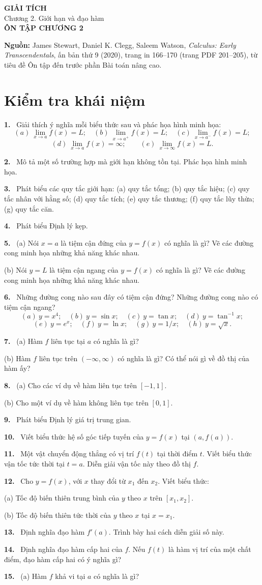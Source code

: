 \documentclass[12pt,a4paper]{article}
\newcommand{\bt}[1]{\par\smallskip\noindent\textbf{#1.}\ }
\begin{document}
\begin{center}
{\Large\bfseries GIẢI TÍCH}\\[5pt]
{\large Chương 2. Giới hạn và đạo hàm}\\[9pt]
{\Large\bfseries ÔN TẬP CHƯƠNG 2}
\end{center}
\noindent\textbf{Nguồn:} James Stewart, Daniel K. Clegg, Saleem Watson, \textit{Calculus: Early Transcendentals}, ấn bản thứ 9 (2020), trang in 166–170 (trang PDF 201–205), từ tiêu đề Ôn tập đến trước phần Bài toán nâng cao.
\section*{Kiểm tra khái niệm}
\bt{1} Giải thích ý nghĩa mỗi biểu thức sau và phác họa hình minh họa:
\[(a)\ \lim_{x\to a}f(x)=L;\quad(b)\ \lim_{x\to a^+}f(x)=L;\quad(c)\ \lim_{x\to a^-}f(x)=L;\]
\[(d)\ \lim_{x\to a}f(x)=\infty;\qquad(e)\ \lim_{x\to\infty}f(x)=L.\]
\bt{2} Mô tả một số trường hợp mà giới hạn không tồn tại. Phác họa hình minh họa.
\bt{3} Phát biểu các quy tắc giới hạn: (a) quy tắc tổng; (b) quy tắc hiệu; (c) quy tắc nhân với hằng số; (d) quy tắc tích; (e) quy tắc thương; (f) quy tắc lũy thừa; (g) quy tắc căn.
\bt{4} Phát biểu Định lý kẹp.
\bt{5} (a) Nói $x=a$ là tiệm cận đứng của $y=f(x)$ có nghĩa là gì? Vẽ các đường cong minh họa những khả năng khác nhau.

(b) Nói $y=L$ là tiệm cận ngang của $y=f(x)$ có nghĩa là gì? Vẽ các đường cong minh họa những khả năng khác nhau.
\bt{6} Những đường cong nào sau đây có tiệm cận đứng? Những đường cong nào có tiệm cận ngang?
\[(a)\ y=x^4;\quad(b)\ y=\sin x;\quad(c)\ y=\tan x;\quad(d)\ y=\tan^{-1}x;\]
\[(e)\ y=e^x;\quad(f)\ y=\ln x;\quad(g)\ y=1/x;\quad(h)\ y=\sqrt{x}.\]
\bt{7} (a) Hàm $f$ liên tục tại $a$ có nghĩa là gì?

(b) Hàm $f$ liên tục trên $(-\infty,\infty)$ có nghĩa là gì? Có thể nói gì về đồ thị của hàm ấy?
\bt{8} (a) Cho các ví dụ về hàm liên tục trên $[-1,1]$.

(b) Cho một ví dụ về hàm không liên tục trên $[0,1]$.
\bt{9} Phát biểu Định lý giá trị trung gian.
\bt{10} Viết biểu thức hệ số góc tiếp tuyến của $y=f(x)$ tại $(a,f(a))$.
\bt{11} Một vật chuyển động thẳng có vị trí $f(t)$ tại thời điểm $t$. Viết biểu thức vận tốc tức thời tại $t=a$. Diễn giải vận tốc này theo đồ thị $f$.
\begin{samepage}
\bt{12} Cho $y=f(x)$, với $x$ thay đổi từ $x_1$ đến $x_2$. Viết biểu thức:

(a) Tốc độ biến thiên trung bình của $y$ theo $x$ trên $[x_1,x_2]$.

(b) Tốc độ biến thiên tức thời của $y$ theo $x$ tại $x=x_1$.
\end{samepage}
\bt{13} Định nghĩa đạo hàm $f'(a)$. Trình bày hai cách diễn giải số này.
\bt{14} Định nghĩa đạo hàm cấp hai của $f$. Nếu $f(t)$ là hàm vị trí của một chất điểm, đạo hàm cấp hai có ý nghĩa gì?
\bt{15} (a) Hàm $f$ khả vi tại $a$ có nghĩa là gì?
\end{document}
